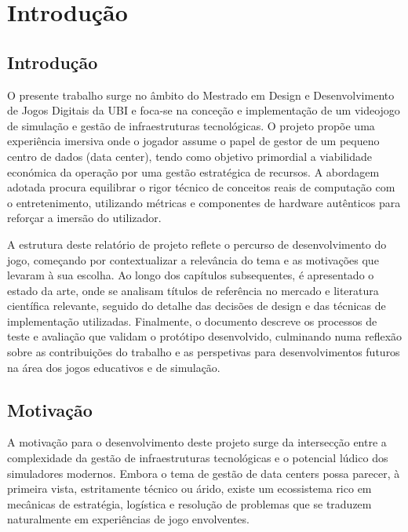 \chapter{Introdução}
\label{cap1}

\section{Introdução}

O presente trabalho surge no âmbito do Mestrado em Design e Desenvolvimento de 
Jogos Digitais da \ac{UBI} e foca-se na conceção e implementação de um videojogo de 
simulação e gestão de infraestruturas tecnológicas. O projeto propõe uma 
experiência imersiva onde o jogador assume o papel de gestor de um pequeno 
centro de dados (data center), tendo como objetivo primordial a viabilidade 
económica da operação por uma gestão estratégica de recursos. A abordagem 
adotada procura equilibrar o rigor técnico de conceitos reais de computação com 
o entretenimento, utilizando métricas e componentes de hardware autênticos para 
reforçar a imersão do utilizador.

A estrutura deste relatório de projeto reflete o percurso de desenvolvimento do jogo, 
começando por contextualizar a relevância do tema e as motivações que levaram à 
sua escolha. Ao longo dos capítulos subsequentes, é apresentado o estado da arte, 
onde se analisam títulos de referência no mercado e literatura científica relevante, 
seguido do detalhe das decisões de design e das técnicas de implementação utilizadas. 
Finalmente, o documento descreve os processos de teste e avaliação que validam o protótipo 
desenvolvido, culminando numa reflexão sobre as contribuições do trabalho e as perspetivas 
para desenvolvimentos futuros na área dos jogos educativos e de simulação.

\section{Motivação}

A motivação para o desenvolvimento deste projeto surge da intersecção entre 
a complexidade da gestão de infraestruturas tecnológicas e o potencial lúdico 
dos simuladores modernos. Embora o tema de gestão de data centers possa parecer,
à primeira vista, estritamente técnico ou árido, existe um ecossistema rico 
em mecânicas de estratégia, logística e resolução de problemas que se 
traduzem naturalmente em experiências de jogo envolventes.

